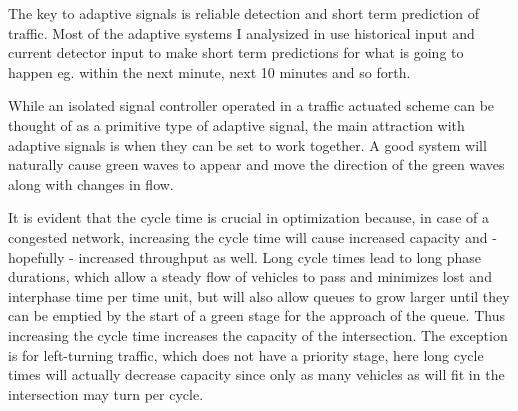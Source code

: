 The key to adaptive signals is reliable detection and short term prediction of traffic. Most of the adaptive systems I analysized in \cite{forprojekt} use historical input and current detector input to make short term predictions for what is going to happen eg. within the next minute, next 10 minutes and so forth.

While an isolated signal controller operated in a traffic actuated scheme can be thought of as a primitive type of adaptive signal, the main attraction with adaptive signals is when they can be set to work together. A good system will naturally cause green waves to appear and move the direction of the green waves along with changes in flow.

It is evident that the cycle time is crucial in optimization because, in case of a congested network, increasing the cycle time will cause increased capacity and - hopefully - increased throughput as well. Long cycle times lead to long phase durations, which allow a steady flow of vehicles to pass and minimizes lost and interphase time per time unit, but will also allow queues to grow larger until they can be emptied by the start of a green stage for the approach of the queue. Thus increasing the cycle time increases the capacity of the intersection. The exception is for left-turning traffic, which does not have a priority stage, here long cycle times will actually decrease capacity since only as many vehicles as will fit in the intersection may turn per cycle.
